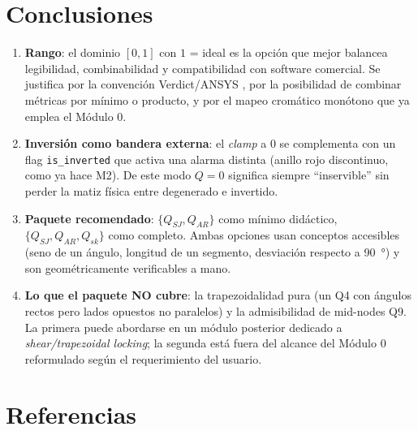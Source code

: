\documentclass[11pt,a4paper]{article}
\begin{document}
\section{Conclusiones}

\begin{enumerate}[leftmargin=14pt]
  \item \textbf{Rango}: el dominio $[0,1]$ con $1$ = ideal es la opci\'on que mejor balancea
  legibilidad, combinabilidad y compatibilidad con software comercial. Se justifica por la
  convenci\'on Verdict/ANSYS \cite{Stimpson2007,ANSYS2021}, por la posibilidad de combinar
  m\'etricas por m\'inimo o producto, y por el mapeo crom\'atico mon\'otono que ya emplea el
  M\'odulo 0.
  \item \textbf{Inversi\'on como bandera externa}: el \textit{clamp} a $0$ se complementa con un
  flag \texttt{is\_inverted} que activa una alarma distinta (anillo rojo discontinuo, como ya
  hace M2). De este modo $Q\!=\!0$ significa siempre ``inservible'' sin perder la matiz f\'isica
  entre degenerado e invertido.
  \item \textbf{Paquete recomendado}: $\{Q_{SJ}, Q_{AR}\}$ como m\'inimo did\'actico,
  $\{Q_{SJ}, Q_{AR}, Q_{sk}\}$ como completo. Ambas opciones usan conceptos accesibles
  (seno de un \'angulo, longitud de un segmento, desviaci\'on respecto a \SI{90}{\degree}) y son
  geom\'etricamente verificables a mano.
  \item \textbf{Lo que el paquete NO cubre}: la trapezoidalidad pura (un Q4 con \'angulos rectos
  pero lados opuestos no paralelos) y la admisibilidad de mid-nodes Q9. La primera puede
  abordarse en un m\'odulo posterior dedicado a \textit{shear/trapezoidal locking}; la segunda
  est\'a fuera del alcance del M\'odulo 0 reformulado seg\'un el requerimiento del usuario.
\end{enumerate}

\section*{Referencias} %
\end{document}

